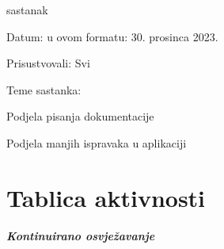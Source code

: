 \begin{packed_enum}
			\item sastanak
			\item[] \begin{packed_item}
				\item Datum: u ovom formatu: 30. prosinca 2023.
				\item Prisustvovali: Svi
				\item Teme sastanka:
				\begin{packed_item}
					\item  Podjela pisanja dokumentacije
					\item  Podjela manjih ispravaka u aplikaciji
				\end{packed_item}
			\end{packed_item}
			
		\end{packed_enum}
		
		\eject
		\section*{Tablica aktivnosti}
		
			\textbf{\textit{Kontinuirano osvježavanje}}\\
			
